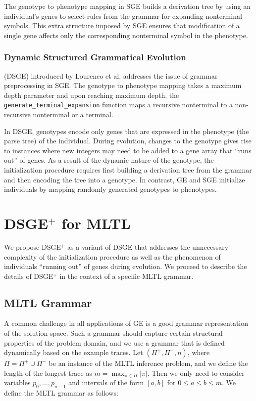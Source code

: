 \documentclass[runningheads]{llncs}
\begin{document}
The genotype to phenotype mapping in SGE builds a derivation tree by using an individual's genes to select rules from the grammar for expanding nonterminal symbols.
This extra structure imposed by SGE ensures that modification of a single gene affects only the corresponding nonterminal symbol in the phenotype. 

\subsubsection{Dynamic Structured Grammatical Evolution} (DSGE) \cite{lourenco_sge_2016} introduced by Lourenco et al. addresses the issue of grammar preprocessing in SGE.
The genotype to phenotype mapping takes a maximum depth parameter and upon reaching maximum depth, the \texttt{generate\_terminal\_expansion} function maps a recursive nonterminal to a non-recursive nonterminal or a terminal.

In DSGE, genotypes encode only genes that are expressed in the phenotype (the parse tree) of the individual. 
During evolution, changes to the genotype gives rise to instances where new integers may need to be added to a gene array that ``runs out'' of genes. 
As a result of the dynamic nature of the genotype, the initialization procedure requires first building a derivation tree from the grammar and then encoding the tree into a genotype. 
In contrast, GE and SGE initialize individuals by mapping randomly generated genotypes to phenotypes. 

\section{DSGE$^+$ for MLTL} 
We propose DSGE$^+$ as a variant of DSGE that addresses the unnecessary complexity of the initialization procedure as well as the phenomenon of individuals ``running out'' of genes during evolution.
We proceed to describe the details of DSGE$^+$ in the context of a specific MLTL grammar.

\subsection{MLTL Grammar}
A common challenge in all applications of GE is a good grammar representation of the solution space. 
Such a grammar should capture certain structural properties of the problem domain, and we use a grammar that is defined dynamically based on the example traces. 
Let $(\Pi^+, \Pi^-, n)$, where $\Pi = \Pi^+ \cup \Pi^-$ be an instance of the MLTL inference problem, and we define the length of the longest trace as $m = \max_{\pi \in \Pi} |\pi|$. 
Then we only need to consider variables $p_0, ..., p_{n-1}$ and intervals of the form $[a, b]$ for $0 \leq a \leq b \leq m$.
We define the MLTL grammar as follows:
\end{document}
